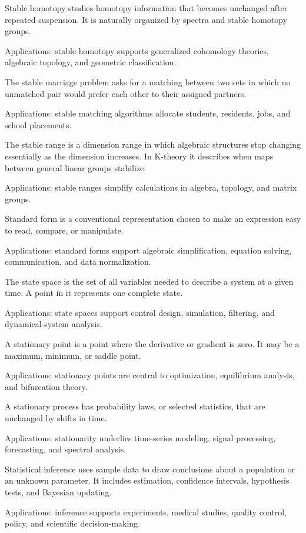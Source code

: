 Stable homotopy studies homotopy information that becomes unchanged after repeated suspension. It is naturally organized by spectra and stable homotopy groups. \par\noindent Applications: stable homotopy supports generalized cohomology theories, algebraic topology, and geometric classification.

The stable marriage problem asks for a matching between two sets in which no unmatched pair would prefer each other to their assigned partners. \par\noindent Applications: stable matching algorithms allocate students, residents, jobs, and school placements.

The stable range is a dimension range in which algebraic structures stop changing essentially as the dimension increases. In K-theory it describes when maps between general linear groups stabilize. \par\noindent Applications: stable ranges simplify calculations in algebra, topology, and matrix groups.

Standard form is a conventional representation chosen to make an expression easy to read, compare, or manipulate. \par\noindent Applications: standard forms support algebraic simplification, equation solving, communication, and data normalization.

The state space is the set of all variables needed to describe a system at a given time. A point in it represents one complete state. \par\noindent Applications: state spaces support control design, simulation, filtering, and dynamical-system analysis.

A stationary point is a point where the derivative or gradient is zero. It may be a maximum, minimum, or saddle point. \par\noindent Applications: stationary points are central to optimization, equilibrium analysis, and bifurcation theory.

A stationary process has probability laws, or selected statistics, that are unchanged by shifts in time. \par\noindent Applications: stationarity underlies time-series modeling, signal processing, forecasting, and spectral analysis.

Statistical inference uses sample data to draw conclusions about a population or an unknown parameter. It includes estimation, confidence intervals, hypothesis tests, and Bayesian updating. \par\noindent Applications: inference supports experiments, medical studies, quality control, policy, and scientific decision-making.

